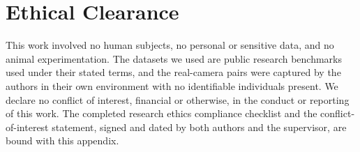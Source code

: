 \chapter{Ethical Clearance}
\label{app:ethics_clearance}

This work involved no human subjects, no personal or sensitive data, and
no animal experimentation. The datasets we used are public research
benchmarks used under their stated terms, and the real-camera pairs were
captured by the authors in their own environment with no identifiable
individuals present. We declare no conflict of interest, financial or
otherwise, in the conduct or reporting of this work. The completed
research ethics compliance checklist and the conflict-of-interest
statement, signed and dated by both authors and the supervisor, are bound
with this appendix.

